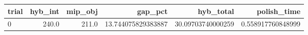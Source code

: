 \begin{tabular}{lrrrrr}
\hline
trial & hyb_int & mip_obj & gap_pct & hyb_total & polish_time \\ \hline
0 & 240.0 & 211.0 & 13.744075829383887 & 30.09703740000259 & 0.558917760848999 \\
\hline
\end{tabular}
